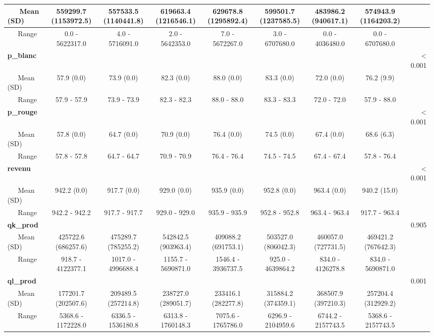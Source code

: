 \documentclass[11pt, a4paper]{article}
\begin{document}
\begin{sidewaystable}
\begin{center}
\begin{tabular}{l|c|c|c|c|c|c|c|r}
\hline
~~~Mean (SD) & 559299.7 (1153972.5) & 557533.5 (1140441.8) & 619663.4 (1216546.1) 
& 629678.8 (1295892.4) & 599501.7 (1237585.5) & 483986.2 (940617.1) & 574943.9 (1164203.2) & \\
\hline
~~~Range & 0.0 - 5622317.0 & 4.0 - 5716091.0 & 2.0 - 5642353.0 & 7.0 - 5672267.0 & 3.0 - 6707680.0 & 0.0 - 4036480.0 & 0.0 - 6707680.0 & \\
\hline
\textbf{p\_blanc} &  &  &  &  &  &  &  & < 0.001\\
\hline
~~~Mean (SD) & 57.9 (0.0) & 73.9 (0.0) & 82.3 (0.0) & 88.0 (0.0) & 83.3 (0.0) & 72.0 (0.0) & 76.2 (9.9) & \\
\hline
~~~Range & 57.9 - 57.9 & 73.9 - 73.9 & 82.3 - 82.3 & 88.0 - 88.0 & 83.3 - 83.3 & 72.0 - 72.0 & 57.9 - 88.0 & \\
\hline
\textbf{p\_rouge} &  &  &  &  &  &  &  & < 0.001\\
\hline
~~~Mean (SD) & 57.8 (0.0) & 64.7 (0.0) & 70.9 (0.0) & 76.4 (0.0) & 74.5 (0.0) & 67.4 (0.0) & 68.6 (6.3) & \\
\hline
~~~Range & 57.8 - 57.8 & 64.7 - 64.7 & 70.9 - 70.9 & 76.4 - 76.4 & 74.5 - 74.5 & 67.4 - 67.4 & 57.8 - 76.4 & \\
\hline
\textbf{revenu} &  &  &  &  &  &  &  & < 0.001\\
\hline
~~~Mean (SD) & 942.2 (0.0) & 917.7 (0.0) & 929.0 (0.0) & 935.9 (0.0) & 952.8 (0.0) & 963.4 (0.0) & 940.2 (15.0) & \\
\hline
~~~Range & 942.2 - 942.2 & 917.7 - 917.7 & 929.0 - 929.0 & 935.9 - 935.9 & 952.8 - 952.8 & 963.4 - 963.4 & 917.7 - 963.4 & \\
\hline
\textbf{qk\_prod} &  &  &  &  &  &  &  & 0.905\\
\hline
~~~Mean (SD) & 425722.6 (686257.6) & 475289.7 (785255.2) & 542842.5 (903963.4) & 409088.2 (691753.1) & 503527.0 (806042.3) & 460057.0 (727731.5) & 469421.2 (767642.3) & \\
\hline
~~~Range & 918.7 - 4122377.1 & 1017.0 - 4996688.4 & 1155.7 - 5690871.0 & 1546.4 - 
3936737.5 & 925.0 - 4639864.2 & 834.0 - 4126278.8 & 834.0 - 5690871.0 & \\
\hline
\textbf{ql\_prod} &  &  &  &  &  &  &  & 0.001\\
\hline
~~~Mean (SD) & 177201.7 (202507.6) & 209489.5 (257214.8) & 238727.0 (289051.7) & 233416.1 (282277.8) & 315884.2 (374359.1) & 368507.9 (397210.3) & 257204.4 (312929.2) & \\
\hline
~~~Range & 5368.6 - 1172228.0 & 6336.5 - 1536180.8 & 6313.8 - 1760148.3 & 7075.6 - 1765786.0 & 6296.9 - 2104959.6 & 6744.2 - 2157743.5 & 5368.6 - 2157743.5 & \\
\hline
\end{tabular}
\end{center}
\end{sidewaystable}
\end{document}
